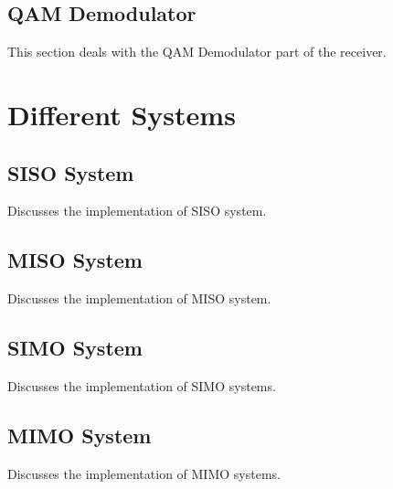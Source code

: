 \subsection{QAM Demodulator}
This section deals with the QAM Demodulator part of the receiver.


\section{Different Systems}
\subsection{SISO System}
Discusses the implementation of SISO system.

\subsection{MISO System}
Discusses the implementation of MISO system.

\subsection{SIMO System}
Discusses the implementation of SIMO systems.

\subsection{MIMO System}
Discusses the implementation of MIMO systems.
 